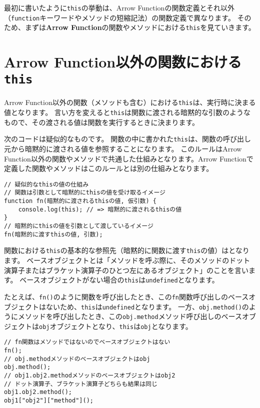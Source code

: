 最初に書いたように\texttt{this}の挙動は、Arrow
Functionの関数定義とそれ以外（\texttt{function}キーワードやメソッドの短縮記法）の関数定義で異なります。
そのため、まずは\textbf{Arrow
Function}の関数やメソッドにおける\texttt{this}を見ていきます。

\hypertarget{function-without-arrow-function-this}{%
\section{\texorpdfstring{Arrow
Function以外の関数における\texttt{this}}{Arrow Function以外の関数におけるthis}}\label{function-without-arrow-function-this}}

Arrow
Function以外の関数（メソッドも含む）における\texttt{this}は、実行時に決まる値となります。
言い方を変えると\texttt{this}は関数に渡される暗黙的な引数のようなもので、その渡される値は関数を実行するときに決まります。

次のコードは疑似的なものです。
関数の中に書かれた\texttt{this}は、関数の呼び出し元から暗黙的に渡される値を参照することになります。
このルールはArrow
Function以外の関数やメソッドで共通した仕組みとなります。Arrow
Functionで定義した関数やメソッドはこのルールとは別の仕組みとなります。

\begin{lstlisting}
// 疑似的なthisの値の仕組み
// 関数は引数として暗黙的にthisの値を受け取るイメージ
function fn(暗黙的に渡されるthisの値, 仮引数) {
    console.log(this); // => 暗黙的に渡されるthisの値
}
// 暗黙的にthisの値を引数として渡しているイメージ
fn(暗黙的に渡すthisの値, 引数);
\end{lstlisting}

関数における\texttt{this}の基本的な参照先（暗黙的に関数に渡す\texttt{this}の値）は\textbf{}となります。
ベースオブジェクトとは「メソッドを呼ぶ際に、そのメソッドのドット演算子またはブラケット演算子のひとつ左にあるオブジェクト」のことを言います。
ベースオブジェクトがない場合の\texttt{this}は\texttt{undefined}となります。

たとえば、\texttt{fn()}のように関数を呼び出したとき、この\texttt{fn}関数呼び出しのベースオブジェクトはないため、\texttt{this}は\texttt{undefined}となります。
一方、\texttt{obj.method()}のようにメソッドを呼び出したとき、この\texttt{obj.method}メソッド呼び出しのベースオブジェクトは\texttt{obj}オブジェクトとなり、\texttt{this}は\texttt{obj}となります。

\begin{lstlisting}
// fn関数はメソッドではないのでベースオブジェクトはない
fn();
// obj.methodメソッドのベースオブジェクトはobj
obj.method();
// obj1.obj2.methodメソッドのベースオブジェクトはobj2
// ドット演算子、ブラケット演算子どちらも結果は同じ
obj1.obj2.method();
obj1["obj2"]["method"]();
\end{lstlisting}

